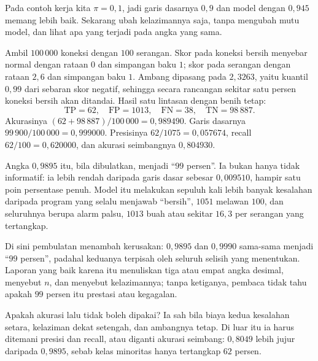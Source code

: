 Pada contoh kerja kita $\pi=0{,}1$, jadi garis dasarnya $0{,}9$ dan model dengan
$0{,}945$ memang lebih baik. Sekarang ubah kelazimannya saja, tanpa mengubah mutu model,
dan lihat apa yang terjadi pada angka yang sama.

\begin{contoh}
Ambil $100\,000$ koneksi dengan $100$ serangan. Skor pada koneksi bersih menyebar
normal dengan rataan $0$ dan simpangan baku $1$; skor pada serangan dengan rataan
$2{,}6$ dan simpangan baku $1$. Ambang dipasang pada $2{,}3263$, yaitu
kuantil $0{,}99$ dari sebaran skor negatif, sehingga secara rancangan sekitar satu persen
koneksi bersih akan ditandai. Hasil satu lintasan dengan benih tetap:
\[
\mathrm{TP}=62,\quad \mathrm{FP}=1013,\quad \mathrm{FN}=38,\quad \mathrm{TN}=98\,887 .
\]
Akurasinya $(62+98\,887)/100\,000=0{,}989490$. Garis dasarnya
$99\,900/100\,000=0{,}999000$. Presisinya $62/1075=0{,}057674$, recall
$62/100=0{,}620000$, dan akurasi seimbangnya $0{,}804930$.
\end{contoh}

Angka $0{,}9895$ itu, bila dibulatkan, menjadi ``$99$ persen''. Ia bukan hanya tidak
informatif: ia lebih rendah daripada garis dasar sebesar $0{,}009510$, hampir satu poin
persentase penuh. Model itu melakukan sepuluh kali lebih banyak kesalahan daripada program
yang selalu menjawab ``bersih'', $1051$ melawan $100$, dan seluruhnya berupa alarm palsu,
$1013$ buah atau sekitar $16{,}3$ per serangan yang tertangkap.

Di sini pembulatan menambah kerusakan: $0{,}9895$ dan $0{,}9990$ sama-sama menjadi
``$99$ persen'', padahal keduanya terpisah oleh seluruh selisih yang menentukan.
Laporan yang baik karena itu menuliskan tiga atau empat angka desimal, menyebut $n$,
dan menyebut kelazimannya; tanpa ketiganya, pembaca tidak tahu apakah $99$ persen
itu prestasi atau kegagalan.

Apakah akurasi lalu tidak boleh dipakai? Ia sah bila biaya kedua kesalahan setara,
kelaziman dekat setengah, dan ambangnya tetap. Di luar itu ia harus ditemani presisi dan
recall, atau diganti akurasi seimbang: $0{,}8049$ lebih jujur daripada $0{,}9895$, sebab
kelas minoritas hanya tertangkap $62$ persen.

